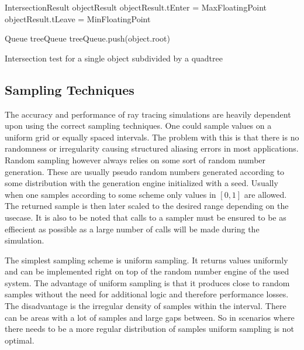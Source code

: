 \documentclass[a4paper,10pt]{article}
\begin{document}
    \begin{algorithm}
        \label{alg:object_intersect}
        \SetAlgoLined
        IntersectionResult objectResult\;
        objectResult.tEnter = MaxFloatingPoint\;
        objectResult.tLeave = MinFloatingPoint\;

        Queue treeQueue\;
        treeQueue.push(object.root)\;


        \caption{Intersection test for a single object subdivided by a quadtree}
    \end{algorithm}


    \subsection{Sampling Techniques} \label{sec:sampling}

    The accuracy and performance of ray tracing simulations are heavily dependent upon
    using the correct sampling techniques.
    One could sample values on a uniform grid or equally spaced intervals.
    The problem with this is that there is no randomness or irregularity
    causing structured aliasing errors in most applications. 
    Random sampling however always relies on some sort of random number generation.
    These are usually pseudo random numbers generated according to some
    distribution with the generation engine initialized with a seed.
    Usually when one samples according to some scheme only values in 
    $[0,1]$ are allowed.
    The returned sample is then later scaled to the desired range depending
    on the usecase.
    It is also to be noted that calls to a sampler must be ensured to
    be as effiecient as possible as a large number of calls will be
    made during the simulation.

    The simplest sampling scheme is uniform sampling.
    It returns values uniformly and can be implemented right on top of
    the random number engine of the used system.
    The advantage of uniform sampling is that it produces close to random
    samples without the need for additional logic and therefore
    performance losses.
    The disadvantage is the irregular density of samples within the interval.
    There can be areas with a lot of samples and large gaps between.
    So in scenarios where there needs to be a more regular distribution
    of samples uniform sampling is not optimal.
\end{document}
